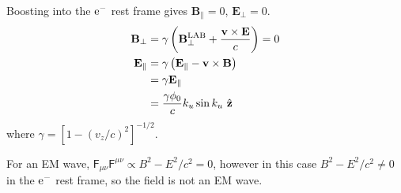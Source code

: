 \begin{parts}
	Boosting into the $\mathrm{e}^{-}$ rest frame gives $\mathbf{B}_\parallel=0$, $\mathbf{E}_\perp=0$.
	\begin{align*}
		\mathbf{B}_\perp &= \gamma \left(\mathbf{B}_\perp^\textnormal{LAB} + \frac{\mathbf{v}\times\mathbf{E}}{c}\right) = 0 \\
		\mathbf{E}_\parallel &= \gamma \left(\mathbf{E}_\parallel - \mathbf{v}\times\mathbf{B}\right) \\
		&= \gamma \mathbf{E}_\parallel \\
		&= \frac{\gamma\phi_0}{c} k_u \sin k_u \ \hat{\mathbf{z}}
	\end{align*}
	where $\gamma=[1-(v_z/c)^2]^{-1/2}$.
	
	For an EM wave, $\mathsf{F}_{\mu\nu} \mathsf{F}^{\mu\nu} \propto B^2 - E^2/c^2 = 0$, however in this case $B^2 - E^2/c^2 \neq 0$ in the $\mathrm{e}^{-}$ rest frame, so the field is not an EM wave.
\end{parts}